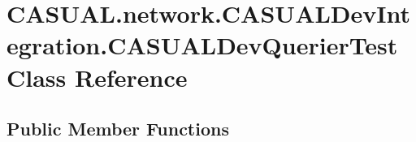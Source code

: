\hypertarget{class_c_a_s_u_a_l_1_1network_1_1_c_a_s_u_a_l_dev_integration_1_1_c_a_s_u_a_l_dev_querier_test}{\section{C\-A\-S\-U\-A\-L.\-network.\-C\-A\-S\-U\-A\-L\-Dev\-Integration.\-C\-A\-S\-U\-A\-L\-Dev\-Querier\-Test Class Reference}
\label{class_c_a_s_u_a_l_1_1network_1_1_c_a_s_u_a_l_dev_integration_1_1_c_a_s_u_a_l_dev_querier_test}
}
\subsection*{Public Member Functions}
